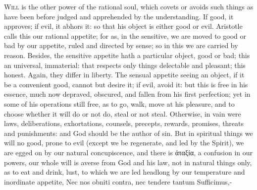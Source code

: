 {\lettrine{W}{ill} is the other power of the rational soul, which covets or
avoids such things as have been before judged and apprehended by the
understanding. If good, it approves; if evil, it abhors it: so that his
object is either good or evil. Aristotle calls this our rational
appetite; for as, in the sensitive, we are moved to good or bad by our
appetite, ruled and directed by sense; so in this we are carried by
reason. Besides, the sensitive appetite hath a particular object, good
or bad; this an universal, immaterial: that respects only things
delectable and pleasant; this honest. Again, they differ in liberty.
The sensual appetite seeing an object, if it be a convenient good,
cannot but desire it; if evil, avoid it: but this is free in his
essence, much now depraved, obscured, and fallen from his first
perfection; yet in some of his operations still free, as to go, walk,
move at his pleasure, and to choose whether it will do or not do, steal
or not steal. Otherwise, in vain were laws, deliberations,
exhortations, counsels, precepts, rewards, promises, threats and
punishments: and God should be the author of sin. But in 
spiritual things we will no good, prone to evil (except we be
regenerate, and led by the Spirit), we are egged on by our natural
concupiscence, and there is ἀταξία, a confusion in our powers,
our whole will is averse from God and his law, not in natural
things only, as to eat and drink, lust, to which we are led headlong by
our temperature and inordinate appetite,
Nec nos obniti contra, nec tendere tantum
Sufficimus,-

}
